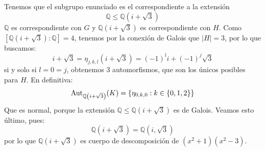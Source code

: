 \begin{ejercicio}
\begin{enumerate}
            Tenemos que el subgrupo enunciado es el correspondiente a la extensión
            \begin{equation*}
                \mathbb{Q}\leq \mathbb{Q}(i+\sqrt{3})
            \end{equation*}
            $\mathbb{Q}$ es correspondiente con $G$ y $\mathbb{Q}(i+\sqrt{3})$ es correspondiente con $H$. Como $[\mathbb{Q}\left(i+\sqrt{3}\right):\mathbb{Q}] = 4$, tenemos  por la conexión de Galois que $|H| = 3$, por lo que buscamos:
            \begin{equation*}
                i+\sqrt{3} = \eta_{j,k,l}(i+\sqrt{3}) = {(-1)}^{l}i + {(-1)}^{j}\sqrt{3}
            \end{equation*}
            si y solo si $l = 0 = j$, obtenemos 3 automorfismos, que son los únicos posibles para $H$. En definitiva:
            \begin{equation*}
                \operatorname{Aut}_{\mathbb{Q}\left(i+\sqrt{3}\right)}(K) = \{\eta_{0,k,0} : k\in \{0,1,2\}\}
            \end{equation*}
            Que es normal, porque la extensión $\mathbb{Q}\leq \mathbb{Q}(i+\sqrt{3})$ es de Galois. Veamos esto último, pues:
            \begin{equation*}
                \mathbb{Q}\left(i+\sqrt{3}\right) = \mathbb{Q}\left(i,\sqrt{3}\right)
            \end{equation*}
            por lo que $\mathbb{Q}(i+\sqrt{3})$ es cuerpo de descomposición de $(x^2+1)(x^2-3)$.
    \end{enumerate}
\end{ejercicio}

